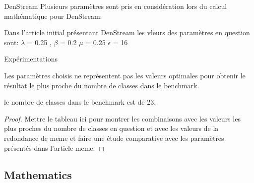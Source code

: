 \documentclass{beamer}
\begin{document}
\begin{frame}{DenStream}
Plusieurs paramètres sont pris en considération lors du calcul mathématique pour DenStream:

\begin{table}
	\centering
	\caption{Les différets paramètres de l'algorithme DenStream et leur fonctionnemment} 
\end{table} 

Dans l'article initial présentant DenStream les vleurs des paramètres en question sont:
$\lambda$ = 0.25 , 
$\beta$ = 0.2
$\mu$ = 0.25
$\epsilon$ = 16
\end{frame}


\begin{frame}{Expérimentations}

\begin{Theorem}
	Les paramètres choisis ne représentent pas les valeurs optimales pour obtenir le résultat le plus proche du nombre de classes dans le benchmark.
	
	le nombre de classes dans le benchmark est de 23.
\end{Theorem}

\begin{proof}
	Mettre le tableau ici pour montrer les combinaisons avec les valeurs les plus proches du nombre de classes en question et avec les valeurs de la redondance de meme et faire une étude comparative avec les paramètres présentés dans l'article meme.
\end{proof}
	
\end{frame}


\subsection{Mathematics}
\end{document}
